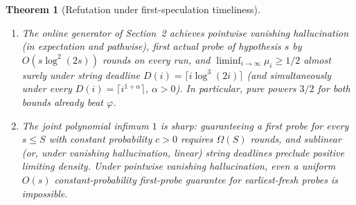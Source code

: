 \documentclass[11pt]{article}
\theoremstyle{plain}
\newtheorem{theorem}{Theorem}
\theoremstyle{definition}
\theoremstyle{remark}
\begin{document}
\begin{theorem}[Refutation under first-speculation timeliness]\label{thm:first}
\begin{enumerate}[label=\textup{(\arabic*)}]
\item The online generator of Section~2 achieves pointwise vanishing hallucination (in expectation and pathwise), first actual probe of hypothesis $s$ by $O(s \log^2(2s))$ rounds on every run, and $\liminf_{i \to \infty} \mu_i \ge 1/2$ almost surely under string deadline $D(i) = \lceil i \log^3(2i) \rceil$ (and simultaneously under every $D(i) = \lceil i^{1+\alpha} \rceil$, $\alpha > 0$). In particular, pure powers $3/2$ for both bounds already beat $\varphi$.
\item The joint polynomial infimum $1$ is sharp: guaranteeing a first probe for every $s \le S$ with constant probability $c > 0$ requires $\Omega(S)$ rounds, and sublinear (or, under vanishing hallucination, linear) string deadlines preclude positive limiting density. Under pointwise vanishing hallucination, even a uniform $O(s)$ constant-probability first-probe guarantee for earliest-fresh probes is impossible.
\end{enumerate}
\end{theorem}
\end{document}
